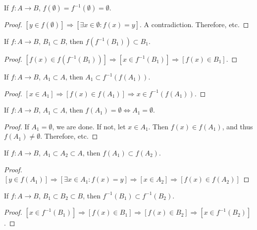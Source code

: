 \documentclass[crop=false,class=article,oneside]{standalone}
\begin{document}
        \begin{corollary}
        If $f:A\rightarrow B$, $f(\emptyset) = f^{-1}(\emptyset) = \emptyset$.
        \end{corollary}
        \begin{proof}
        $[y\in f(\emptyset)]\Rightarrow [\exists x\in \emptyset:f(x)=y]$. A contradiction. Therefore, etc.
        \end{proof}
        \begin{theorem}
        If $f:A\rightarrow B$, $B_1\subset B$, then $f(f^{-1}(B_1))\subset B_1$.
        \end{theorem}
        \begin{proof}
        $[f(x)\in f(f^{-1}(B_1))]\Rightarrow [x\in f^{-1}(B_1)]\Rightarrow [f(x)\in B_1]$.
        \end{proof}
        \begin{theorem}
        If $f:A\rightarrow B$, $A_1\subset A$, then $A_1\subset f^{-1}(f(A_1))$.
        \end{theorem}
        \begin{proof}
        $[x\in A_1]\Rightarrow [f(x) \in f(A_1)]\Rightarrow x\in f^{-1}(f(A_1))$.
        \end{proof}
        \begin{theorem}
        If $f:A\rightarrow B$, $A_1\subset A$, then $f(A_1) = \emptyset \Leftrightarrow A_1 = \emptyset$.
        \end{theorem}
        \begin{proof}
        If $A_1 = \emptyset$, we are done. If not, let $x\in A_1$. Then $f(x)\in f(A_1)$, and thus $f(A_1)\ne \emptyset$. Therefore, etc.
        \end{proof}
        \begin{corollary}
        If $f:A\rightarrow B$, $A_1\subset A_2\subset A$, then $f(A_1)\subset f(A_2)$.
        \end{corollary}
        \begin{proof}
        $[y\in f(A_1)]\Rightarrow[\exists x\in A_1:f(x)=y]\Rightarrow [x\in A_2] \Rightarrow [f(x)\in f(A_2)]$
        \end{proof}
        \begin{corollary}
        If $f:A\rightarrow B$, $B_1\subset B_2\subset B$, then $f^{-1}(B_1)\subset f^{-1}(B_2)$.
        \end{corollary}
        \begin{proof}
        $[x\in f^{-1}(B_1)] \Rightarrow [f(x) \in B_1] \Rightarrow [f(x) \in B_2]\Rightarrow [x\in f^{-1}(B_2)]$.
        \end{proof}
\end{document}
